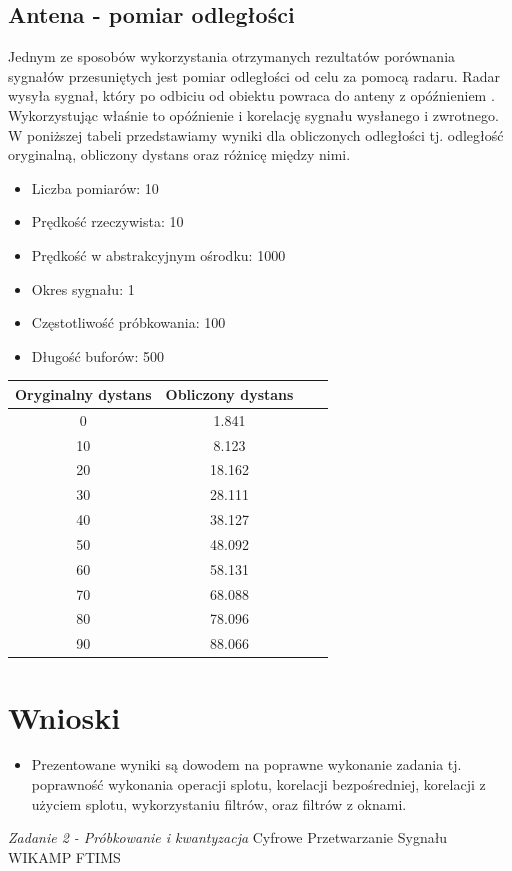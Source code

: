\documentclass[12pt]{article}
\begin{document}
\subsection{Antena - pomiar odległości}
Jednym ze sposobów wykorzystania otrzymanych rezultatów porównania sygnałów przesuniętych jest pomiar odległości od celu za pomocą radaru. Radar wysyła sygnał, który po odbiciu od obiektu powraca do anteny z opóźnieniem . Wykorzystując właśnie to opóźnienie i korelację sygnału wysłanego i zwrotnego. W poniższej tabeli przedstawiamy wyniki dla obliczonych odległości tj. odległość oryginalną, obliczony dystans oraz różnicę między nimi.
\\
\begin{itemize}
\item Liczba pomiarów: 10
\item Prędkość rzeczywista: 10
\item Prędkość w abstrakcyjnym ośrodku: 1000
\item Okres sygnału: 1
\item Częstotliwość próbkowania: 100
\item Długość buforów: 500
\end{itemize}

\begin{center}
 \begin{tabular}{||c c c c||} 
 \hline
 Oryginalny dystans & Obliczony dystans  \\ [0.5ex] 
 \hline\hline
 0 & 1.841  \\ 
 \hline
 10 & 8.123  \\
 \hline
 20 & 18.162 \\
 \hline
 30 & 28.111 \\
 \hline
 40 & 38.127 \\ 
 \hline
 50 &48.092  \\ 
 \hline
 60 & 58.131  \\
 \hline
 70 & 68.088  \\
 \hline
 80 & 78.096  \\
 \hline
 90 & 88.066  \\ 
 \hline
\end{tabular}
\end{center}


\section{Wnioski}
\begin {itemize}
\item Prezentowane wyniki są dowodem na poprawne wykonanie zadania tj. poprawność wykonania operacji splotu, korelacji bezpośredniej, korelacji z użyciem splotu, wykorzystaniu filtrów, oraz filtrów z oknami.
\end {itemize}


\begin{thebibliography}{0}
\label{zad1}
\textit{Zadanie 2 - Próbkowanie i kwantyzacja} Cyfrowe Przetwarzanie Sygnału WIKAMP FTIMS\newline
\end{thebibliography}
\end{document}
